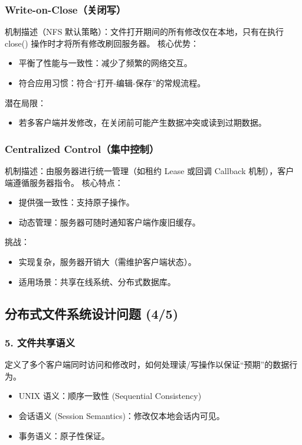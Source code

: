 \subsubsection{Write-on-Close（关闭写）}
机制描述（NFS 默认策略）：文件打开期间的所有修改仅在本地，只有在执行 close() 操作时才将所有修改刷回服务器。
核心优势：
\begin{itemize}
    \item 平衡了性能与一致性：减少了频繁的网络交互。
    \item 符合应用习惯：符合“打开-编辑-保存”的常规流程。
\end{itemize}
潜在局限：
\begin{itemize}
    \item 若多客户端并发修改，在关闭前可能产生数据冲突或读到过期数据。
\end{itemize}

\subsubsection{Centralized Control（集中控制）}
机制描述：由服务器进行统一管理（如租约 Lease 或回调 Callback 机制），客户端遵循服务器指令。
核心特点：
\begin{itemize}
    \item 提供强一致性：支持原子操作。
    \item 动态管理：服务器可随时通知客户端作废旧缓存。
\end{itemize}
挑战：
\begin{itemize}
    \item 实现复杂，服务器开销大（需维护客户端状态）。
    \item 适用场景：共享在线系统、分布式数据库。
\end{itemize}

\subsection{分布式文件系统设计问题 (4/5)}

\subsubsection{5. 文件共享语义}
定义了多个客户端同时访问和修改时，如何处理读/写操作以保证“预期”的数据行为。
\begin{itemize}
    \item UNIX 语义：顺序一致性 (Sequential Consistency)
    \item 会话语义 (Session Semantics)：修改仅本地会话内可见。
    \item 事务语义：原子性保证。
\end{itemize}

